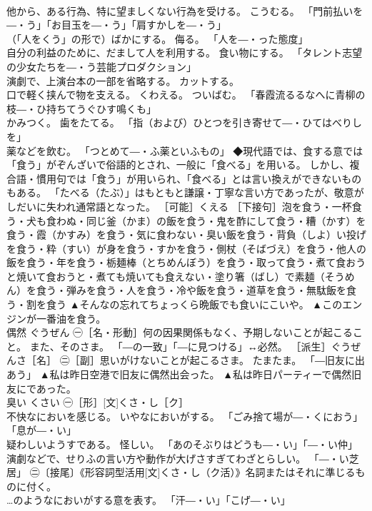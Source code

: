 \documentclass[8pt]{extreport}
\begin{document}
\begin{CJK}{UTF8}{min}
\\	他から、ある行為、特に望ましくない行為を受ける。 こうむる。 「門前払いを―・う」「お目玉を―・う」「肩すかしを―・う」 
\\	（「人をくう」の形で）ばかにする。 侮る。 「人を―・った態度」 
\\	自分の利益のために、だまして人を利用する。 食い物にする。 「タレント志望の少女たちを―・う芸能プロダクション」 
\\	演劇で、上演台本の一部を省略する。 カットする。 
\\	口で軽く挟んで物を支える。 くわえる。 ついばむ。 「春霞流るるなへに青柳の枝―・ひ持ちてうぐひす鳴くも」 
\\	かみつく。 歯をたてる。 「指（および）ひとつを引き寄せて―・ひてはべりしを」 
\\	薬などを飲む。 「つとめて―・ふ薬といふもの」 ◆現代語では、食する意では「食う」がぞんざいで俗語的とされ、一般に「食べる」を用いる。 しかし、複合語・慣用句では「食う」が用いられ、「食べる」とは言い換えができないものもある。 「たべる（たぶ）」はもともと謙譲・丁寧な言い方であったが、敬意がしだいに失われ通常語となった。 ［可能］くえる ［下接句］泡を食う・一杯食う・犬も食わぬ・同じ釜（かま）の飯を食う・鬼を酢にして食う・糟（かす）を食う・霞（かすみ）を食う・気に食わない・臭い飯を食う・背負（しよ）い投げを食う・粋（すい）が身を食う・すかを食う・側杖（そばづえ）を食う・他人の飯を食う・年を食う・栃麺棒（とちめんぼう）を食う・取って食う・煮て食おうと焼いて食おうと・煮ても焼いても食えない・塗り箸（ばし）で素麺（そうめん）を食う・弾みを食う・人を食う・冷や飯を食う・道草を食う・無駄飯を食う・割を食う	▲そんなの忘れてちょっくら晩飯でも食いにこいや。 ▲このエンジンが一番油を食う。
\\	偶然	ぐうぜん	㊀［名・形動］何の因果関係もなく、予期しないことが起こること。 また、そのさま。 「―の一致」「―に見つける」↔必然。 ［派生］ぐうぜんさ［名］ ㊁［副］思いがけないことが起こるさま。 たまたま。 「―旧友に出あう」	▲私は昨日空港で旧友に偶然出会った。 ▲私は昨日パーティーで偶然旧友にであった。
\\	臭い	くさい	㊀［形］[文]くさ・し［ク］ 
\\	不快なにおいを感じる。 いやなにおいがする。 「ごみ捨て場が―・くにおう」「息が―・い」 
\\	疑わしいようすである。 怪しい。 「あのそぶりはどうも―・い」「―・い仲」 
\\	演劇などで、せりふの言い方や動作が大げさすぎてわざとらしい。 「―・い芝居」 ㊁〔接尾〕《形容詞型活用[文]くさ・し（ク活）》名詞またはそれに準じるものに付く。 
\\	…のようなにおいがする意を表す。 「汗―・い」「こげ―・い」 

\end{CJK}
\end{document}
